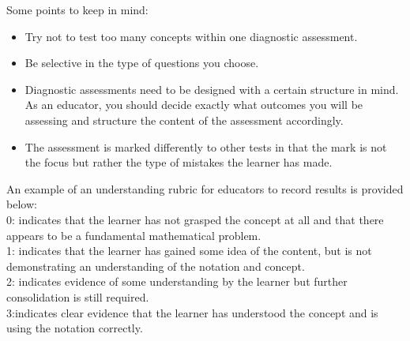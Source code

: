 Some points to keep in mind:
\begin{itemize}[noitemsep]
\item Try not to test too many concepts within one diagnostic assessment.
\item Be selective in the type of questions you choose. 
\item Diagnostic assessments need to be designed with a certain structure in mind. As an educator, you should decide exactly what outcomes you will be assessing and structure the content of the assessment accordingly. 
\item The assessment is marked differently to other tests in that the mark is not the focus but rather the type of mistakes the learner has made.
\end{itemize}
An example of an understanding rubric for educators to record results is provided below:\\

0: indicates that the learner has not grasped the concept at all and that there appears to be a fundamental mathematical problem.\\
1: indicates that the learner has gained some idea of the content, but is not demonstrating an understanding of the notation and concept.\\
2: indicates evidence of some understanding by the learner but further consolidation is still required.\\
3:indicates clear evidence that the learner has understood the concept and is using the notation correctly.\par

